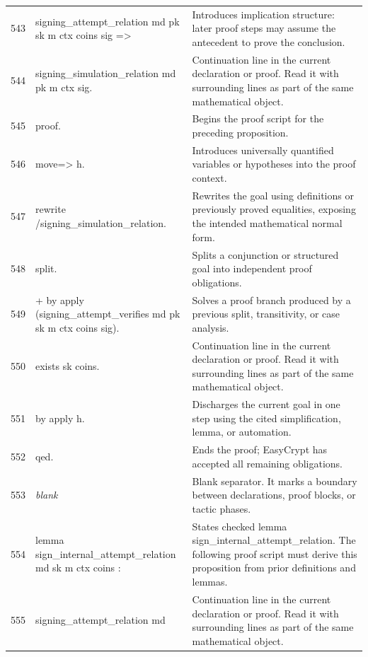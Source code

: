 \documentclass[10pt]{article}
\begin{document}
\begin{longtable}{r L{0.53\textwidth} L{0.37\textwidth}}
543 & {\ttfamily\scriptsize   signing\_attempt\_relation md pk sk m ctx coins sig =>} & Introduces implication structure: later proof steps may assume the antecedent to prove the conclusion. \\
544 & {\ttfamily\scriptsize   signing\_simulation\_relation md pk m ctx sig.} & Continuation line in the current declaration or proof.  Read it with surrounding lines as part of the same mathematical object. \\
545 & {\ttfamily\scriptsize proof.} & Begins the proof script for the preceding proposition. \\
546 & {\ttfamily\scriptsize move=> h.} & Introduces universally quantified variables or hypotheses into the proof context. \\
547 & {\ttfamily\scriptsize rewrite /signing\_simulation\_relation.} & Rewrites the goal using definitions or previously proved equalities, exposing the intended mathematical normal form. \\
548 & {\ttfamily\scriptsize split.} & Splits a conjunction or structured goal into independent proof obligations. \\
549 & {\ttfamily\scriptsize + by apply (signing\_attempt\_verifies md pk sk m ctx coins sig).} & Solves a proof branch produced by a previous split, transitivity, or case analysis. \\
550 & {\ttfamily\scriptsize exists sk coins.} & Continuation line in the current declaration or proof.  Read it with surrounding lines as part of the same mathematical object. \\
551 & {\ttfamily\scriptsize by apply h.} & Discharges the current goal in one step using the cited simplification, lemma, or automation. \\
552 & {\ttfamily\scriptsize qed.} & Ends the proof; EasyCrypt has accepted all remaining obligations. \\
553 & {\ttfamily\scriptsize \emph{blank}} & Blank separator.  It marks a boundary between declarations, proof blocks, or tactic phases. \\
554 & {\ttfamily\scriptsize lemma sign\_internal\_attempt\_relation md sk m ctx coins :} & States checked lemma sign\_internal\_attempt\_relation.  The following proof script must derive this proposition from prior definitions and lemmas. \\
555 & {\ttfamily\scriptsize   signing\_attempt\_relation md} & Continuation line in the current declaration or proof.  Read it with surrounding lines as part of the same mathematical object. \\

\end{longtable}
\end{document}
